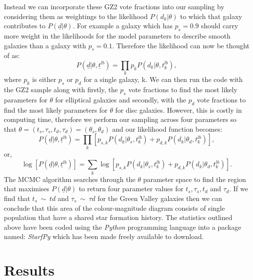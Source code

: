 \documentclass{mn2e}
\begin{document}
Instead we can incorporate these GZ2 vote fractions  into our sampling by considering them as weightings to the likelihood $P(d_{k}|\theta)$ to which that galaxy contributes to $P(\underline{d}|\theta)$. For example a galaxy which has $p_{s} = 0.9$ should carry more weight in the likelihoods for the model parameters to describe smooth galaxies than a galaxy with $p_{s} = 0.1$. Therefore the likelihood can now be thought of as:
\begin{equation*}
P(\underline{d}|\theta, \underline{t}^{lb}) = \prod_{k} p_{k} P(d_{k}|\theta, t_{k}^{lb}),
\end{equation*}
where $p_{k}$ is either $p_{s}$ or $p_{d}$ for a single galaxy, k. We can then run the code with the GZ2 sample along with firstly, the $p_{s}$ vote fractions to find the most likely parameters for $\theta$ for elliptical galaxies and secondly, with the $p_{d}$ vote fractions to find the most likely parameters for $\theta$ for disc galaxies. However, this is costly in computing time, therefore we perform our sampling across four parameters so that $\theta = (t_{s}, \tau_{s}, t_{d}, \tau_{d}) = (\theta_{s}, \theta_{d})$ and our likelihood function becomes:
\begin{equation*}
P(\underline{d}|\theta, \underline{t}^{lb}) = \prod_{k} \left [p_{s, k} P(d_{k}|\theta_{s}, t_{k}^{lb}) + p_{d, k} P(d_{k}|\theta_{d}, t_{k}^{lb}) \right],
\end{equation*}
or,
\begin{equation*}
\log \left[ P(\underline{d}|\theta, \underline{t}^{lb}) \right] = \sum_{k} \log \left [p_{s, k} P(d_{k}|\theta_{s}, t_{k}^{lb}) + p_{d, k} P(d_{k}|\theta_{d}, t_{k}^{lb}) \right]. 
\end{equation*}
The MCMC algorithm searches through the $\theta$ parameter space to find the region that maximises $P(\underline{d} | \theta)$ to return four parameter values for $t_{s}, \tau_{s}, t_{d}$ and $\tau_{d}$. If we find that $t_{s}~\sim~t{d}$ and $\tau_{s} ~\sim~ \tau{d}$ for the Green Valley galaxies then we can conclude that this area of the colour-magnitude diagram consists of  single population that have a shared star formation history. The statistics outlined above have been coded using the \emph{Python} programming language into a package named: \emph{StarfPy} which has been made freely available to download.  


\section{Results}\label{results}
\end{document}
